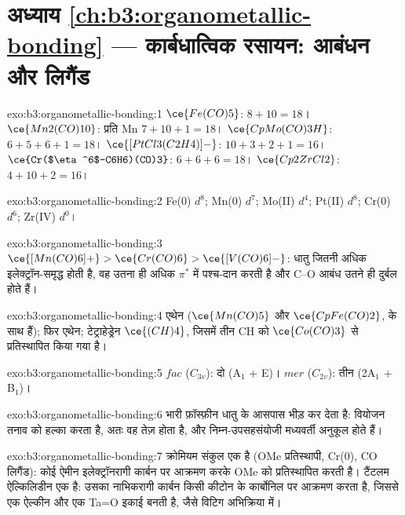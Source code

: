 \section*{अध्याय \ref{ch:b3:organometallic-bonding} --- कार्बधात्विक रसायन: आबंधन और लिगैंड}

\begin{solution}{exo:b3:organometallic-bonding:1}
$\ce{Fe(CO)5}$: $8 + 10 = 18$। $\ce{Mn2(CO)10}$: प्रति Mn $7 + 10 + 1 = 18$। $\ce{CpMo(CO)3H}$: $6 + 5 + 6 + 1 =
18$। $\ce{[PtCl3(C2H4)]-}$: $10 + 3 + 2 + 1 = 16$। $\ce{Cr($\eta^6$-C6H6)(CO)3}$: $6 + 6 + 6 = 18$। $\ce{Cp2ZrCl2}$:
$4 + 10 + 2 = 16$।
\end{solution}

\begin{solution}{exo:b3:organometallic-bonding:2}
Fe(0) $d^8$; Mn(0) $d^7$; Mo(II) $d^4$; Pt(II) $d^8$; Cr(0) $d^6$; Zr(IV) $d^0$।
\end{solution}

\begin{solution}{exo:b3:organometallic-bonding:3}
$\ce{[Mn(CO)6]+} > \ce{Cr(CO)6} > \ce{[V(CO)6]-}$: धातु जितनी अधिक इलेक्ट्रॉन-समृद्ध होती है, वह उतना ही अधिक
$\pi^*$ में पश्च-दान करती है और C--O आबंध उतने ही दुर्बल होते हैं।
\end{solution}

\begin{solution}{exo:b3:organometallic-bonding:4}
एथेन ($\ce{Mn(CO)5}$ और $\ce{CpFe(CO)2}$,  के साथ  हैं); फिर एथेन; टेट्राहेड्रेन
$\ce{(CH)4}$, जिसमें तीन CH को $\ce{Co(CO)3}$ से प्रतिस्थापित किया गया है।
\end{solution}

\begin{solution}{exo:b3:organometallic-bonding:5}
$fac$ ($C_{3v}$): दो (A$_1$ + E)। $mer$ ($C_{2v}$): तीन (2A$_1$ + B$_1$)।
\end{solution}

\begin{solution}{exo:b3:organometallic-bonding:6}
भारी फ़ॉस्फ़ीन धातु के आसपास भीड़ कर देता है: वियोजन तनाव को हल्का करता है, अतः वह
तेज़ होता है, और निम्न-उपसहसंयोजी मध्यवर्ती अनुकूल होते हैं।
\end{solution}

\begin{solution}{exo:b3:organometallic-bonding:7}
क्रोमियम संकुल एक  है (OMe प्रतिस्थापी, Cr(0), CO लिगैंड): कोई
ऐमीन इलेक्ट्रॉनरागी  कार्बन पर आक्रमण करके OMe को प्रतिस्थापित करती है। टैंटलम
ऐल्किलिडीन एक  है: उसका नाभिकरागी कार्बन किसी कीटोन के
कार्बोनिल पर आक्रमण करता है, जिससे एक ऐल्कीन और एक Ta=O इकाई बनती है, जैसे विटिग अभिक्रिया में।
\end{solution}


